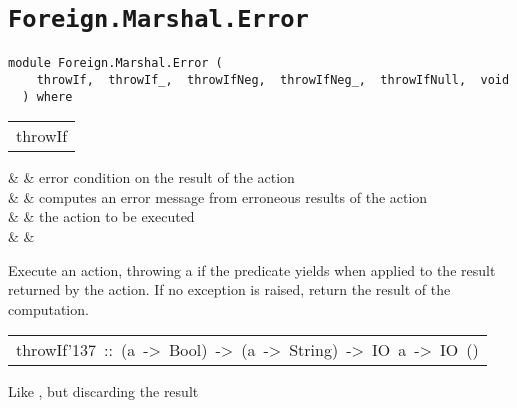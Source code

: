 \chapter{\texttt{Foreign.Marshal.Error}}
\label{module:Foreign.Marshal.Error}
\haddockbeginheader
{\haddockverb\begin{verbatim}
module Foreign.Marshal.Error (
    throwIf,  throwIf_,  throwIfNeg,  throwIfNeg_,  throwIfNull,  void
  ) where\end{verbatim}}
\haddockendheader

\begin{haddockdesc}
\item[\begin{tabular}{@{}l}
throwIf
\end{tabular}]\haddockbegindoc
\haddockbeginargs
\haddockdecltt{::} &  & error condition on the result of the  action
 \\
                                                 \haddockdecltt{->} &  & computes an error message from erroneous results
 of the  action
 \\
                                                                                                    \haddockdecltt{->} &  & the  action to be executed
 \\
                                                                                                                                                \haddockdecltt{->} &  & \\
\haddockendargs\par
Execute an  action, throwing a  if the predicate yields
  when applied to the result returned by the  action.
 If no exception is raised, return the result of the computation.
\par

\end{haddockdesc}
\begin{haddockdesc}
\item[\begin{tabular}{@{}l}
throwIf{\char '137}\ ::\ (a\ ->\ Bool)\ ->\ (a\ ->\ String)\ ->\ IO\ a\ ->\ IO\ ()
\end{tabular}]\haddockbegindoc
Like , but discarding the result
\par

\end{haddockdesc}
